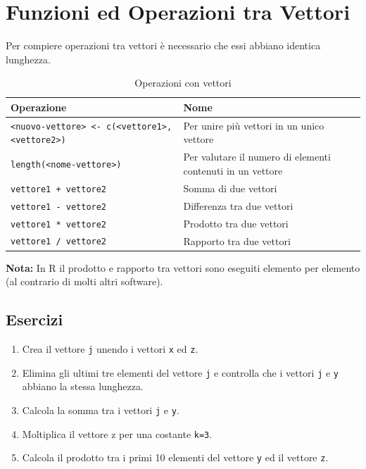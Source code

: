 \documentclass[
]{book}
\providecommand{\tightlist}{%
  \setlength{\itemsep}{0pt}\setlength{\parskip}{0pt}}
\begin{document}
\hypertarget{funzioni-ed-operazioni-tra-vettori}{%
\section{Funzioni ed Operazioni tra Vettori}\label{funzioni-ed-operazioni-tra-vettori}}

Per compiere operazioni tra vettori è necessario che essi abbiano identica lunghezza.

\begin{table}[!h]

\caption{\label{tab:table-vector-operators}Operazioni con vettori}
\centering
\begin{tabular}[t]{l|l}
\hline
Operazione & Nome\\
\hline
\texttt{<nuovo-vettore> <- c(<vettore1>, <vettore2>)} & Per unire più vettori in un unico vettore\\
\hline
\texttt{length(<nome-vettore>)} & Per valutare il numero di elementi contenuti in un vettore\\
\hline
\texttt{vettore1 + vettore2} & Somma di due vettori\\
\hline
\texttt{vettore1 - vettore2} & Differenza tra due vettori\\
\hline
\texttt{vettore1 * vettore2} & Prodotto tra due vettori\\
\hline
\texttt{vettore1 / vettore2} & Rapporto tra due vettori\\
\hline
\end{tabular}
\end{table}

\textbf{Nota:} In R il prodotto e rapporto tra vettori sono eseguiti elemento per elemento (al contrario di molti altri software).

\hypertarget{esercizi-4}{%
\subsection*{Esercizi}\label{esercizi-4}}

\begin{enumerate}
\def\labelenumi{\arabic{enumi}.}
\tightlist
\item
  Crea il vettore \texttt{j} unendo i vettori \texttt{x} ed \texttt{z}.
\item
  Elimina gli ultimi tre elementi del vettore \texttt{j} e controlla che i vettori \texttt{j} e \texttt{y} abbiano la stessa lunghezza.
\item
  Calcola la somma tra i vettori \texttt{j} e \texttt{y}.
\item
  Moltiplica il vettore z per una costante \texttt{k=3}.
\item
  Calcola il prodotto tra i primi 10 elementi del vettore \texttt{y} ed il vettore \texttt{z}.
\end{enumerate}
\end{document}
